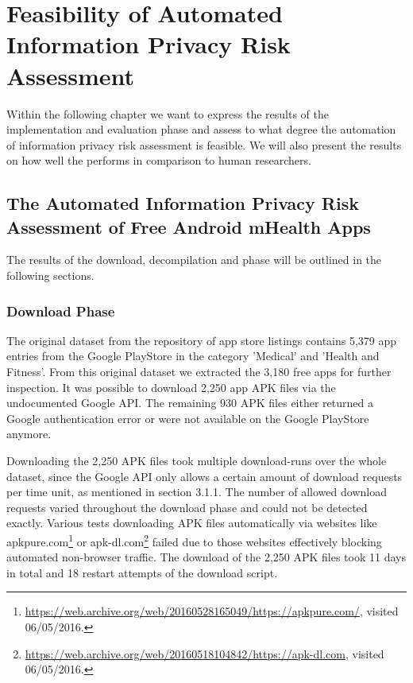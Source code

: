 \section{Feasibility of Automated Information Privacy Risk Assessment}

Within the following chapter we want to express the results of the implementation and evaluation phase and assess to what degree the automation of information privacy risk assessment is feasible.
We will also present the results on how well the \aiprat performs in comparison to human researchers.

\subsection{The Automated Information Privacy Risk Assessment of Free Android mHealth Apps}

The results of the download, decompilation and \sca phase will be outlined in the following sections.

\subsubsection{Download Phase}

The original dataset from the \cite{Xu2015} repository of app store listings contains 5,379 app entries from the Google PlayStore in the category 'Medical' and 'Health and Fitness'.
From this original dataset we extracted the 3,180 free apps for further inspection.
It was possible to download 2,250 app APK files via the undocumented Google API.
The remaining 930 APK files either returned a Google authentication error or were not available on the Google PlayStore anymore.

Downloading the 2,250 APK files took multiple download-runs over the whole dataset, since the Google API only allows a certain amount of download requests per time unit, as mentioned in section 3.1.1.
The number of allowed download requests varied throughout the download phase and could not be detected exactly.
Various tests downloading APK files automatically via websites like apkpure.com\footnote{\url{https://web.archive.org/web/20160528165049/https://apkpure.com/}, visited 06/05/2016.} or apk-dl.com\footnote{\url{https://web.archive.org/web/20160518104842/https://apk-dl.com}, visited 06/05/2016.} failed due to those websites effectively blocking automated non-browser traffic.
The download of the 2,250 APK files took 11 days in total and 18 restart attempts of the download script.

